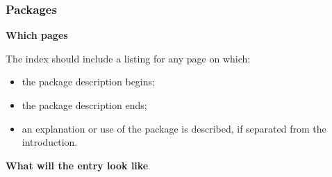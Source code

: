 \documentclass[11pt]{article}
\begin{document}
\subsubsection{Packages}%
%
\label{packages}

\begin{description}
   \item{\bf Which pages}

         The index should include a listing for any page on which:
           \begin{itemize}
              \item the package description begins;
              \item the package description ends;
              \item an explanation or use of the package
                    is described, if separated from the introduction.
           \end{itemize}
   \item{\bf What will the entry look like}


\end{description}
\end{document}
